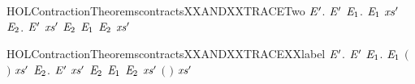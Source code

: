 \newcommand{\HOLContractionTheoremscontractsXXANDXXTRACEOne}{\UseVerbatim{HOLContractionTheoremscontractsXXANDXXTRACEOne}}
\begin{SaveVerbatim}{HOLContractionTheoremscontractsXXANDXXTRACETwo}
\HOLTokenTurnstile{} \HOLSymConst{\HOLTokenForall{}} \ensuremath{\HOLBoundVar{E}\sp{\prime}}.
         \ensuremath{\HOLBoundVar{E}\sp{\prime}} \HOLSymConst{\HOLTokenImp{}}
       \HOLSymConst{\HOLTokenForall{}} \ensuremath{\HOLBoundVar{E}\sb{\mathrm{1}}}.
              \ensuremath{\HOLBoundVar{E}\sb{\mathrm{1}}} \HOLSymConst{\HOLTokenImp{}}
           \HOLSymConst{\HOLTokenExists{}}\ensuremath{\HOLBoundVar{xs}\sp{\prime}} \ensuremath{\HOLBoundVar{E}\sb{\mathrm{2}}}.
                \ensuremath{\HOLBoundVar{E}\sp{\prime}} \ensuremath{\HOLBoundVar{xs}\sp{\prime}} \ensuremath{\HOLBoundVar{E}\sb{\mathrm{2}}} \HOLSymConst{\HOLTokenConj{}} \ensuremath{\HOLBoundVar{E}\sb{\mathrm{1}}}  \ensuremath{\HOLBoundVar{E}\sb{\mathrm{2}}} \HOLSymConst{\HOLTokenConj{}}
                \ensuremath{\HOLBoundVar{xs}\sp{\prime}} \HOLSymConst{\HOLTokenLeq{}}  
\end{SaveVerbatim}
\newcommand{\HOLContractionTheoremscontractsXXANDXXTRACETwo}{\UseVerbatim{HOLContractionTheoremscontractsXXANDXXTRACETwo}}
\begin{SaveVerbatim}{HOLContractionTheoremscontractsXXANDXXTRACEXXlabel}
\HOLTokenTurnstile{} \HOLSymConst{\HOLTokenForall{}} \ensuremath{\HOLBoundVar{E}\sp{\prime}}.
         \ensuremath{\HOLBoundVar{E}\sp{\prime}} \HOLSymConst{\HOLTokenImp{}}
       \HOLSymConst{\HOLTokenForall{}}  \ensuremath{\HOLBoundVar{E}\sb{\mathrm{1}}}.
              \ensuremath{\HOLBoundVar{E}\sb{\mathrm{1}}} \HOLSymConst{\HOLTokenConj{}}  \ensuremath{(} \ensuremath{)}  \HOLSymConst{\HOLTokenImp{}}
           \HOLSymConst{\HOLTokenExists{}}\ensuremath{\HOLBoundVar{xs}\sp{\prime}} \ensuremath{\HOLBoundVar{E}\sb{\mathrm{2}}}.
                \ensuremath{\HOLBoundVar{E}\sp{\prime}} \ensuremath{\HOLBoundVar{xs}\sp{\prime}} \ensuremath{\HOLBoundVar{E}\sb{\mathrm{2}}} \HOLSymConst{\HOLTokenConj{}} \ensuremath{\HOLBoundVar{E}\sb{\mathrm{1}}}  \ensuremath{\HOLBoundVar{E}\sb{\mathrm{2}}} \HOLSymConst{\HOLTokenConj{}}
                \ensuremath{\HOLBoundVar{xs}\sp{\prime}} \HOLSymConst{\HOLTokenLeq{}}   \HOLSymConst{\HOLTokenConj{}}
                \ensuremath{(} \ensuremath{)} \ensuremath{\HOLBoundVar{xs}\sp{\prime}}
\end{SaveVerbatim}
